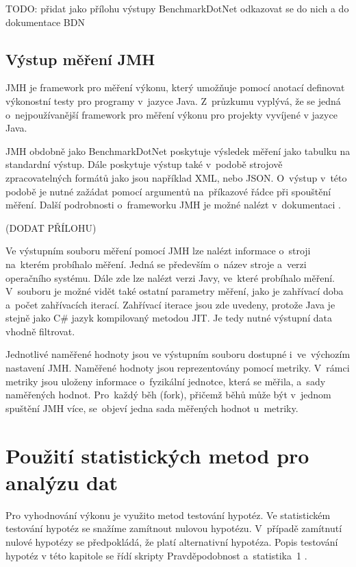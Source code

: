 TODO: přidat jako přílohu výstupy BenchmarkDotNet odkazovat se do nich a do dokumentace BDN

\subsection{Výstup měření JMH}

JMH je framework pro měření výkonu, který umožňuje pomocí anotací definovat výkonostní testy
pro programy v~jazyce Java. Z~průzkumu \cite[]{unitTestingPerformanceSurvey} vyplývá, že se jedná o~nejpoužívanější framework
pro měření výkonu pro projekty vyvíjené v jazyce Java.

JMH obdobně jako BenchmarkDotNet poskytuje výsledek měření jako tabulku na standardní výstup.
Dále poskytuje výstup také v~podobě strojově zpracovatelných formátů jako jsou například XML,
nebo JSON. O~výstup v~této podobě je nutné zažádat pomocí argumentů na~příkazové řádce při
spouštění měření. Další podrobnosti o~frameworku JMH je možné nalézt v~dokumentaci \cite[]{jmh}.

(DODAT PŘÍLOHU)

Ve výstupním souboru měření pomocí JMH lze nalézt informace o~stroji na~kterém probíhalo měření.
Jedná se především o~název stroje a~verzi operačního systému. Dále zde lze nalézt verzi Javy,
ve~které probíhalo měření. V~souboru je možné vidět také ostatní parametry měření, jako je
zahřívací doba a~počet zahřívacích iterací. Zahřívací iterace jsou zde uvedeny, protože Java
je stejně jako C\# jazyk kompilovaný metodou JIT. Je tedy nutné výstupní data vhodně filtrovat.

Jednotlivé naměřené hodnoty jsou ve výstupním souboru dostupné i~ve~výchozím nastavení JMH.
Naměřené hodnoty jsou reprezentovány pomocí metriky. V~rámci metriky jsou uloženy informace
o~fyzikální jednotce, která se měřila, a~sady naměřených hodnot. Pro~každý běh (fork), přičemž běhů
může být v~jednom spuštění JMH více, se~objeví jedna sada měřených hodnot u~metriky.

\section{Použití statistických metod pro analýzu dat}

Pro vyhodnování výkonu je využito metod testování hypotéz. Ve statistickém testování
hypotéz se snažíme zamítnout nulovou hypotézu. V~případě zamítnutí nulové hypotézy
se předpokládá, že platí alternativní hypotéza. Popis testování hypotéz v této kapitole
se řídí skripty Pravděpodobnost a~statistika~1 \cite[]{samal_nmai059_nodate}.

